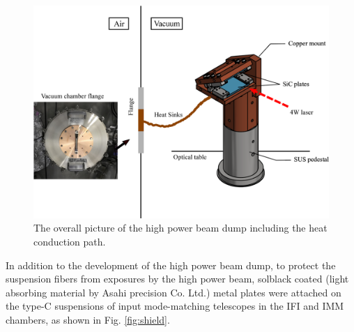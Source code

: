 \begin{figure}[t]
\begin{center}
\includegraphics[scale=0.2]{astrodiv/gw/ioo/dump_figure2.eps}
\caption{The overall picture of the high power beam dump
including the heat conduction path.}
\label{fig:dump}
\end{center}
\end{figure}



In addition to the development of the high power beam dump,
to protect the suspension fibers from exposures by the high power beam,
solblack coated (light absorbing material by Asahi precision Co. Ltd.) metal plates
were attached on the type-C suspensions of input mode-matching telescopes
in the IFI and IMM chambers, as shown in Fig. \ref{fig:shield}.

